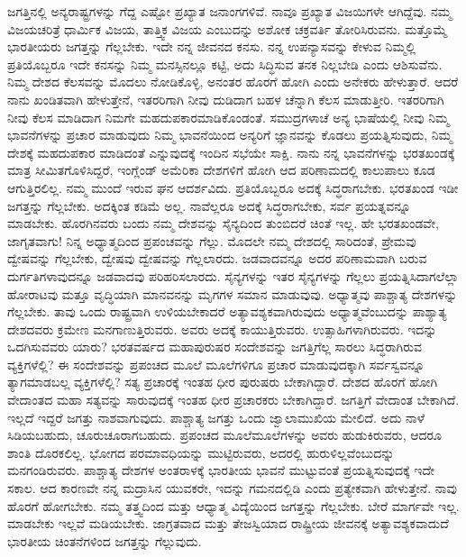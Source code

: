 ಜಗತ್ತಿನಲ್ಲಿ ಅನ್ಯರಾಷ್ಟ್ರಗಳನ್ನು ಗೆದ್ದ ಎಷ್ಟೋ ಪ್ರಖ್ಯಾತ ಜನಾಂಗಗಳಿವೆ. ನಾವೂ ಪ್ರಖ್ಯಾತ ವಿಜಯಿಗಳೇ ಆಗಿದ್ದೆವು. ನಮ್ಮ ವಿಜಯಚರಿತ್ರೆ ಧಾರ್ಮಿಕ ವಿಜಯ, ತಾತ್ತ್ವಿಕ ವಿಜಯ ಎಂಬುದನ್ನು ಅಶೋಕ ಚಕ್ರವರ್ತಿ ತೋರಿಸಿರುವನು. ಮತ್ತೊಮ್ಮೆ ಭಾರತೀಯರು ಜಗತ್ತನ್ನು ಗೆಲ್ಲಬೇಕು. ಇದೇ ನನ್ನ ಜೀವನದ ಕನಸು. ನನ್ನ ಉಪನ್ಯಾಸವನ್ನು ಕೇಳುವ ನಿಮ್ಮಲ್ಲಿ ಪ್ರತಿಯೊಬ್ಬರೂ ಇದೇ ಕನಸನ್ನು ನಿಮ್ಮ ಮನಸ್ಸಿನಲ್ಲೂ ಕಟ್ಟಿ, ಅದು ಸಿದ್ಧಿಸುವ ತನಕ ನಿಲ್ಲಬೇಡಿ ಎಂದು ಆಶಿಸುವೆನು. ನಿಮ್ಮ ದೇಶದ ಕೆಲಸವನ್ನು ಮೊದಲು ನೋಡಿಕೊಳ್ಳಿ, ಅನಂತರ ಹೊರಗೆ ಹೋಗಿ ಎಂದು ಅನೇಕರು ಹೇಳುತ್ತಾರೆ. ಆದರೆ ನಾನು ಖಂಡಿತವಾಗಿ ಹೇಳುತ್ತೇನೆ, ಇತರರಿಗಾಗಿ ನೀವು ದುಡಿದಾಗ ಬಹಳ ಚೆನ್ನಾಗಿ ಕೆಲಸ ಮಾಡುತ್ತೀರಿ. ಇತರರಿಗಾಗಿ ನೀವು ಕೆಲಸ ಮಾಡಿದಾಗ ನಿಮಗೇ ಮಹದುಪಕಾರಮಾಡಿಕೊಂಡಂತೆ. ಸಮುದ್ರಗಳಾಚೆ ಅನ್ಯ ಭಾಷೆಯಲ್ಲಿ ನೀವು ನಿಮ್ಮ ಭಾವನೆಗಳನ್ನು ಪ್ರಚಾರ ಮಾಡುವುದು ನಿಮ್ಮ ಭಾವನೆಯಿಂದ ಅನ್ಯರಿಗೆ ಜ್ಞಾನವನ್ನು ಕೊಡಲು ಪ್ರಯತ್ನಿಸುವುದು, ನಿಮ್ಮ ದೇಶಕ್ಕೆ ಮಹದುಪಕಾರ ಮಾಡಿದಂತೆ ಎನ್ನುವುದಕ್ಕೆ ಇಂದಿನ ಸಭೆಯೇ ಸಾಕ್ಷಿ. ನಾನು ನನ್ನ ಭಾವನೆಗಳನ್ನು ಭರತಖಂಡಕ್ಕೆ ಮಾತ್ರ ಸೀಮಿತಗೊಳಿಸಿದ್ದರೆ, ಇಂಗ್ಲೆಂಡ್​ ಅಮೆರಿಕಾ ದೇಶಗಳಿಗೆ ಹೋಗಿ ಆದ ಪರಿಣಾಮದಲ್ಲಿ ಕಾಲುಪಾಲು ಕೂಡ ಆಗುತ್ತಿರಲಿಲ್ಲ. ನಮ್ಮ ಮುಂದೆ ಇರುವ ಘನ ಆದರ್ಶವಿದು. ಪ್ರತಿಯೊಬ್ಬರೂ ಅದಕ್ಕೆ ಸಿದ್ಧರಾಗಬೇಕು. ಭರತಖಂಡ ಇಡೀ ಜಗತ್ತನ್ನು ಗೆಲ್ಲಬೇಕು. ಅದಕ್ಕಿಂತ ಕಡಿಮೆ ಅಲ್ಲ. ನಾವೆಲ್ಲರೂ ಅದಕ್ಕೆ ಸಿದ್ಧರಾಗಬೇಕು, ಸರ್ವ ಪ್ರಯತ್ನವನ್ನೂ ಮಾಡಬೇಕು. ಹೊರಗಿನವರು ಬಂದು ನಮ್ಮ ದೇಶವನ್ನು ಸೈನ್ಯದಿಂದ ತುಂಬಿದರೆ ಚಿಂತೆ ಇಲ್ಲ. ಹೇ ಭರತಖಂಡವೇ, ಜಾಗೃತವಾಗು! ನಿನ್ನ ಅಧ್ಯಾತ್ಮದಿಂದ ಪ್ರಪಂಚವನ್ನು ಗೆಲ್ಲು. ಮೊದಲೇ ನಮ್ಮ ದೇಶದಲ್ಲಿ ಸಾರಿದಂತೆ, ಪ್ರೇಮವು ದ್ವೇಷವನ್ನು ಗೆಲ್ಲಬೇಕು, ದ್ವೇಷವು ದ್ವೇಷವನ್ನು ಗೆಲ್ಲಲಾರದು. ಜಡವಾದವನ್ನೂ ಅದರ ಪರಿಣಾಮವಾಗಿ ಬರುವ ದುರ್ಗತಿಗಳಾವುದನ್ನೂ ಜಡವಾದವು ಪರಿಹರಿಸಲಾರದು. ಸೈನ್ಯಗಳನ್ನು ಇತರ ಸೈನ್ಯಗಳನ್ನು ಗೆಲ್ಲಲು ಪ್ರಯತ್ನಿಸಿದಾಗಲೆಲ್ಲಾ ಹೋರಾಟವು ಮತ್ತೂ ವೃದ್ಧಿಯಾಗಿ ಮಾನವನನ್ನು ಮೃಗಗಳ ಸಮಾನ ಮಾಡುವುವು. ಅಧ್ಯಾತ್ಮವು ಪಾಶ್ಚಾತ್ಯ ದೇಶಗಳನ್ನು ಗೆಲ್ಲಬೇಕು. ತಾವು ಒಂದು ರಾಷ್ಟ್ರವಾಗಿ ಉಳಿಯಬೇಕಾದರೆ ಅತ್ಯಾವಶ್ಯಕವಾಗಿರುವುದು ಅಧ್ಯಾತ್ಮವೆಂಬುದನ್ನು ಪಾಶ್ಯಾತ್ಯ ದೇಶದವರು ಕ್ರಮೇಣ ಮನಗಾಣುತ್ತಿರುವರು. ಅವರು ಅದಕ್ಕೆ ಕಾಯುತ್ತಿರುವರು. ಉತ್ಸಾಹಿಗಳಾಗಿರುವರು. ಇದನ್ನು ಒದಗಿಸುವವರು ಯಾರು? ಭರತವರ್ಷದ ಮಹಾಪುರುಷರ ಸಂದೇಶವನ್ನು ಜಗತ್ತಿಗೆಲ್ಲ ಸಾರಲು ಸಿದ್ಧರಾಗಿರುವ ವ್ಯಕ್ತಿಗಳೆಲ್ಲಿ? ಈ ಸಂದೇಶವನ್ನು ಪ್ರಪಂಚದ ಮೂಲೆ ಮೂಲೆಗಳಿಗೂ ಪ್ರಚಾರ ಮಾಡುವುದಕ್ಕಾಗಿ ಸರ್ವಸ್ವವನ್ನೂ ತ್ಯಾಗಮಾಡಬಲ್ಲ ವ್ಯಕ್ತಿಗಳೆಲ್ಲಿ? ಸತ್ಯ ಪ್ರಚಾರಕ್ಕೆ ಇಂತಹ ಧೀರ ಪುರುಷರು ಬೇಕಾಗಿದ್ದಾರೆ. ದೇಶದ ಹೊರಗೆ ಹೋಗಿ ವೇದಾಂತದ ಮಹಾ ಸತ್ಯವನ್ನು ಸಾರುವುದಕ್ಕೆ ಇಂತಹ ಧೀರ ಪ್ರಚಾರಕರು ಬೇಕಾಗಿದ್ದಾರೆ. ಜಗತ್ತಿಗೆ ವೇದಾಂತ ಬೇಕಾಗಿದೆ. ಇಲ್ಲದೆ ಇದ್ದರೆ ಜಗತ್ತು ನಾಶವಾಗುವುದು. ಪಾಶ್ಚಾತ್ಯ ಜಗತ್ತು ಒಂದು ಜ್ವಾಲಾಮುಖಿಯ ಮೇಲಿದೆ. ಅದು ನಾಳೆ ಸಿಡಿಯಬಹುದು, ಚೂರುಚೂರಾಗಬಹುದು. ಪ್ರಪಂಚದ ಮೂಲೆಮೂಲೆಗಳನ್ನು ಅವರು ಹುಡುಕಿರುವರು, ಆದರೂ ಶಾಂತಿ ದೊರಕಲಿಲ್ಲ. ಭೋಗದ ಪರಮಾವಧಿಯನ್ನು ಮುಟ್ಟಿರುವರು, ಅದರಲ್ಲಿ ಹುರುಳಿಲ್ಲವೆಂಬುದನ್ನು ಮನಗಂಡಿರುವರು. ಪಾಶ್ಚಾತ್ಯ ದೇಶಗಳ ಅಂತರಾಳಕ್ಕೆ ಭಾರತೀಯ ಭಾವನೆ ಮುಟ್ಟುವಂತೆ ಪ್ರಯತ್ನಿಸುವುದಕ್ಕೆ ಇದೇ ಸಕಾಲ. ಆದ ಕಾರಣವೇ ನನ್ನ ಮದ್ರಾಸಿನ ಯುವಕರೇ, ಇದನ್ನು ಗಮನದಲ್ಲಿಡಿ ಎಂದು ಪ್ರತ್ಯೇಕವಾಗಿ ಹೇಳುತ್ತೇನೆ. ನಾವು ಹೊರಗೆ ಹೋಗಬೇಕು. ನಮ್ಮ ತತ್ತ್ವದಿಂದ ಮತ್ತು ಆಧ್ಯಾತ್ಮ ವಿದ್ಯೆಯಿಂದ ಜಗತ್ತನ್ನು ಗೆಲ್ಲಬೇಕು. ಬೇರೆ ಮಾರ್ಗವೇ ಇಲ್ಲ. ಮಾಡಬೇಕು ಇಲ್ಲವೆ ಮಡಿಯಬೇಕು. ಜಾಗ್ರತವಾದ ಮತ್ತು ತೇಜಸ್ವಿಯಾದ ರಾಷ್ಟ್ರೀಯ ಜೀವನಕ್ಕೆ ಅತ್ಯಾವಶ್ಯಕವಾದುದೆ ಭಾರತೀಯ ಚಿಂತನೆಗಳಿಂದ ಜಗತ್ತನ್ನು ಗೆಲ್ಲುವುದು.

